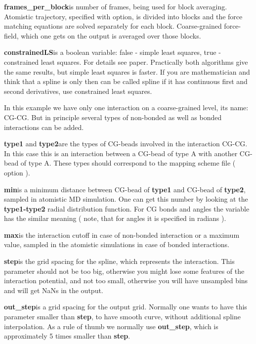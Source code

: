 \textbf{frames\_per\_block}\newline is number of frames, being used for block averaging. Atomistic trajectory, specified with
\textbf{} option, is divided into blocks and the force matching equations are solved separately for each block.
Coarse-grained force-field, which one gets on the output is averaged over those blocks.

\textbf{constrainedLS}\newline is a boolean variable: false - simple least squares, true - constrained least squares. For details see \votca paper.
Practically both algorithms give the same results, but simple least squares is faster. If you are mathematician and think that a spline is only then can be called spline if it has continuous first and second derivatives, use constrained least squares. \newline

In this example we have only one interaction on a coarse-grained level, its name: CG-CG. But in principle several types of non-bonded as well as bonded interactions can be added. 

\textbf{type1} and \textbf{type2}\newline are the types of CG-beads involved in the interaction CG-CG. In this case this is an interaction between a CG-bead of type A with another CG-bead of type A. These types should correspond to the mapping scheme file ( option  ).
 
\textbf{min}\newline is a minimum distance between CG-bead of \textbf{type1} and CG-bead of \textbf{type2},  sampled in atomistic MD simulation. One can get this number by looking at the \textbf{type1-type2} radial distribution function. For CG bonds and angles the variable has the similar meaning ( note, that for angles it is specified in radians ).

\textbf{max}\newline is the interaction cutoff in case of non-bonded interaction or a maximum value, sampled in the atomistic simulations in case of bonded interactions.

\textbf{step}\newline is the grid spacing for the spline, which represents the interaction. This parameter should not be too big, otherwise you might lose some features of the interaction potential, and not too small, otherwise you will have unsampled bins and will get NaNs in the output.

\textbf{out\_step}\newline is a grid spacing for the output grid. Normally one wants to have this parameter smaller than \textbf{step}, 
to have smooth curve, without additional spline interpolation. 
As a rule of thumb we normally use \textbf{out\_step}, which is approximately 5 times smaller than \textbf{step}.

